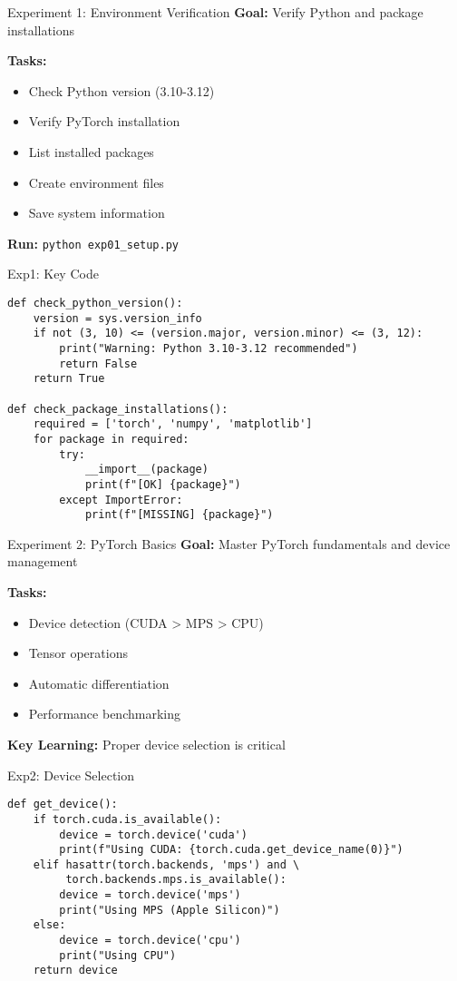 \documentclass[aspectratio=169,10pt]{beamer}
\begin{document}
\begin{frame}{Experiment 1: Environment Verification}
\textbf{Goal:} Verify Python and package installations

\textbf{Tasks:}
\begin{itemize}
    \item Check Python version (3.10-3.12)
    \item Verify PyTorch installation
    \item List installed packages
    \item Create environment files
    \item Save system information
\end{itemize}

\textbf{Run:} \texttt{python exp01\_setup.py}
\end{frame}

\begin{frame}[fragile]{Exp1: Key Code}
\begin{lstlisting}
def check_python_version():
    version = sys.version_info
    if not (3, 10) <= (version.major, version.minor) <= (3, 12):
        print("Warning: Python 3.10-3.12 recommended")
        return False
    return True

def check_package_installations():
    required = ['torch', 'numpy', 'matplotlib']
    for package in required:
        try:
            __import__(package)
            print(f"[OK] {package}")
        except ImportError:
            print(f"[MISSING] {package}")
\end{lstlisting}
\end{frame}

\begin{frame}{Experiment 2: PyTorch Basics}
\textbf{Goal:} Master PyTorch fundamentals and device management

\textbf{Tasks:}
\begin{itemize}
    \item Device detection (CUDA > MPS > CPU)
    \item Tensor operations
    \item Automatic differentiation
    \item Performance benchmarking
\end{itemize}

\textbf{Key Learning:} Proper device selection is critical
\end{frame}

\begin{frame}[fragile]{Exp2: Device Selection}
\begin{lstlisting}
def get_device():
    if torch.cuda.is_available():
        device = torch.device('cuda')
        print(f"Using CUDA: {torch.cuda.get_device_name(0)}")
    elif hasattr(torch.backends, 'mps') and \
         torch.backends.mps.is_available():
        device = torch.device('mps')
        print("Using MPS (Apple Silicon)")
    else:
        device = torch.device('cpu')
        print("Using CPU")
    return device
\end{lstlisting}
\end{frame}
\end{document}
